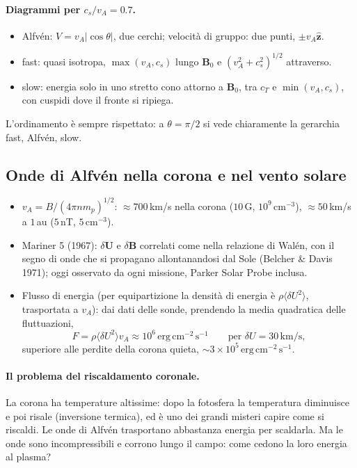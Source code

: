 \paragraph{Diagrammi per $c_s/v_A=0.7$.}
\begin{itemize}
\item Alfvén: $V=v_A|\cos\theta|$, due cerchi; velocità di gruppo: due punti, $\pm v_A\hat{\mathbf{z}}$.
\item fast: quasi isotropa, $\max(v_A,c_s)$ lungo $\mathbf{B}_0$ e $(v_A^2+c_s^2)^{1/2}$ attraverso.
\item slow: energia solo in uno stretto cono attorno a $\mathbf{B}_0$, tra $c_T$ e $\min(v_A,c_s)$, con cuspidi dove il fronte si ripiega.
\end{itemize}
L'ordinamento è sempre rispettato: a $\theta=\pi/2$ si vede chiaramente la gerarchia fast, Alfvén, slow.

\subsection{Onde di Alfvén nella corona e nel vento solare}

\begin{itemize}
\item $v_A=B/(4\pi nm_p)^{1/2}$: $\approx700\,$km/s nella corona ($10\,$G, $10^9\,\mathrm{cm^{-3}}$), $\approx50\,$km/s a $1\,$au ($5\,$nT, $5\,\mathrm{cm^{-3}}$).
\item Mariner 5 (1967): $\delta\mathbf{U}$ e $\delta\mathbf{B}$ correlati come nella relazione di Walén, con il segno di onde che si propagano allontanandosi dal Sole (Belcher \& Davis 1971); oggi osservato da ogni missione, Parker Solar Probe inclusa.
\item Flusso di energia (per equipartizione la densità di energia è $\rho\langle\delta U^2\rangle$, trasportata a $v_A$): dai dati delle sonde, prendendo la media quadratica delle fluttuazioni,
\begin{equation}
F=\rho\langle\delta U^2\rangle v_A\approx10^6\,\mathrm{erg\,cm^{-2}\,s^{-1}}\qquad\text{per }\delta U=30\,\mathrm{km/s},
\end{equation}
superiore alle perdite della corona quieta, $\sim3\times10^5\,\mathrm{erg\,cm^{-2}\,s^{-1}}$.
\end{itemize}

\paragraph{Il problema del riscaldamento coronale.} La corona ha temperature altissime: dopo la fotosfera la temperatura diminuisce e poi risale (inversione termica), ed è uno dei grandi misteri capire come si riscaldi. Le onde di Alfvén trasportano abbastanza energia per scaldarla. Ma le onde sono incompressibili e corrono lungo il campo: come cedono la loro energia al plasma?


